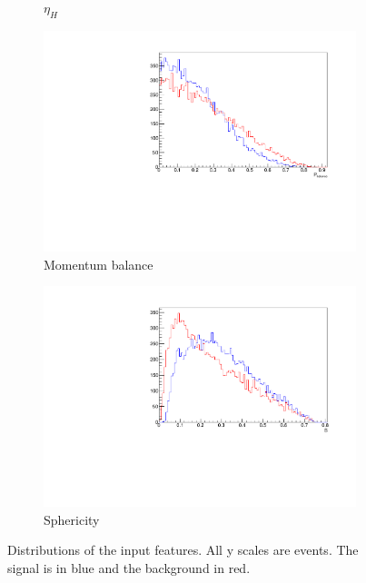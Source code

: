 \begin{figure}[htbp]
\begin{subfigure}[b]{0.3\textwidth}
	                \caption{$\eta_H$}
	                \label{fig:etah}
	\end{subfigure}
	\begin{subfigure}[b]{0.3\textwidth}
	                \includegraphics[width=\textwidth]{img/pbalance}
	                \caption{Momentum balance}
	                \label{fig:pbal}
	\end{subfigure}
	\begin{subfigure}[b]{0.3\textwidth}
	                \includegraphics[width=\textwidth]{img/sphericity}
	                \caption{Sphericity}
	                \label{fig:sphericity}
	\end{subfigure}

	\caption{Distributions of the input features. All y scales are events. The signal is in blue and the background in red.}
	
	\label{fig:label}



\end{figure}

